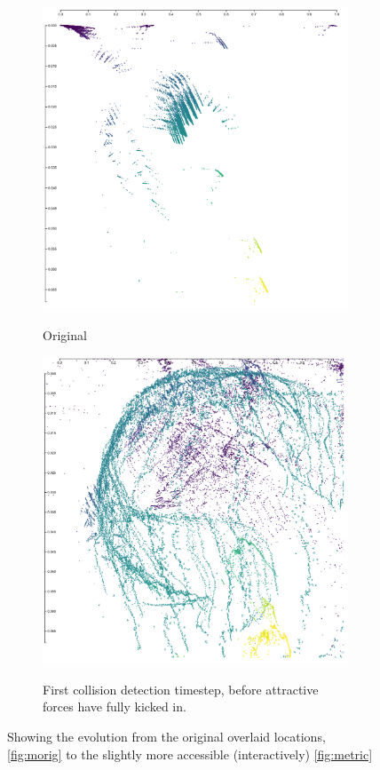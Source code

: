 \documentclass{pasa}%
\begin{document}
\begin{figure}[H]
\begin{subfigure}{.5\textwidth}
  \centering
  \includegraphics[width=\textwidth]{fig/metric-1.png}
  \label{fig:morig}
  \caption{Original}
\end{subfigure}%
\begin{subfigure}{.5\textwidth}
  \centering
  \includegraphics[width=\textwidth]{fig/metric0.png}
  \label{fig:m1}
  \caption{First collision detection timestep, before attractive forces have fully kicked in.}
\end{subfigure}

\caption{Showing the evolution from the original overlaid locations, \autoref{fig:morig} to the slightly more accessible (interactively) \autoref{fig:metric}}
\end{figure}
\end{document}
